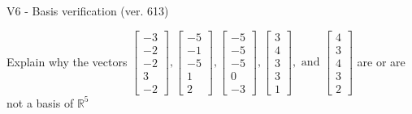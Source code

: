\begin{exercise}
  \begin{exerciseTitle}V6 - Basis verification (ver. 613)\end{exerciseTitle}
  \begin{exerciseStatement}
    Explain why the vectors \(\left[\begin{array}{r}
-3 \\
-2 \\
-2 \\
3 \\
-2
\end{array}\right] , \left[\begin{array}{r}
-5 \\
-1 \\
-5 \\
1 \\
2
\end{array}\right] , \left[\begin{array}{r}
-5 \\
-5 \\
-5 \\
0 \\
-3
\end{array}\right] , \left[\begin{array}{r}
3 \\
4 \\
3 \\
3 \\
1
\end{array}\right] , \text{ and } \left[\begin{array}{r}
4 \\
3 \\
4 \\
3 \\
2
\end{array}\right]\) are or are not a basis of \(\mathbb{R}^5\)	



\end{exerciseStatement}
\end{exercise}
